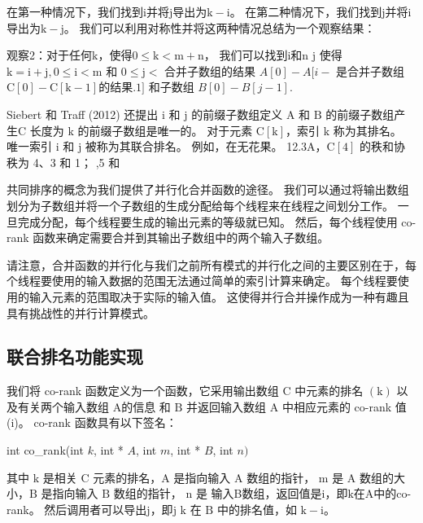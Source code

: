 在第一种情况下，我们找到$\mathrm{i}$并将$\mathrm{j}$导出为$\mathrm{k}-\mathrm{i}$。 
在第二种情况下，我们找到$\mathrm{j}$并将$\mathrm{i}$导出为$\mathrm{k}-\mathrm{j}$。 
我们可以利用对称性并将这两种情况总结为一个观察结果：

观察2：对于任何$\mathrm{k}$，使得$0 \leq \mathrm{k}<\mathrm{m}+\mathrm{n}$，
我们可以找到$\mathrm{i}$和$\mathrm {n}$ {j} 使得 $\mathrm{k}=\mathrm{i}+\mathrm{j}, 0 \leq \mathrm{i}<\mathrm{m}$ 和 $0 \leq \mathrm {j}<$ 合并子数组的结果 $A[0]-A[i-$ 是合并子数组 $\mathrm{C}[0]-\mathrm{C}[\mathrm{k}-1 ]$的结果$.1]$ 和子数组 $B[0]-B[j-1]$.

Siebert 和 Traff (2012) 还提出 $\mathrm{i}$ 和 $\mathrm{j}$ 的前缀子数组定义 $\mathrm{A}$ 和 $\mathrm{B}$ 的前缀子数组产生$\mathrm{C}$ 长度为 $\mathrm{k}$ 的前缀子数组是唯一的。 
对于元素 $\mathrm{C}[\mathrm{k}]$，索引 $\mathrm{k}$ 称为其排名。 
唯一索引 $\mathrm{i}$ 和 $\mathrm{j}$ 被称为其联合排名。 
例如，在无花果。 12.3A，$\mathrm{C}[4]$ 的秩和协秩为 4、3 和 1； ,5 和

共同排序的概念为我们提供了并行化合并函数的途径。 
我们可以通过将输出数组划分为子数组并将一个子数组的生成分配给每个线程来在线程之间划分工作。 
一旦完成分配，每个线程要生成的输出元素的等级就已知。 
然后，每个线程使用 co-rank 函数来确定需要合并到其输出子数组中的两个输入子数组。

请注意，合并函数的并行化与我们之前所有模式的并行化之间的主要区别在于，每个线程要使用的输入数据的范围无法通过简单的索引计算来确定。 每个线程要使用的输入元素的范围取决于实际的输入值。 这使得并行合并操作成为一种有趣且具有挑战性的并行计算模式。

\subsection{联合排名功能实现}
我们将 co-rank 函数定义为一个函数，它采用输出数组 $\mathrm{C}$ 中元素的排名 $(\mathrm{k})$ 以及有关两个输入数组 $\mathrm{A} 的信息 $ 和 $\mathrm{B}$ 并返回输入数组 A 中相应元素的 co-rank 值 (i)。 co-rank 函数具有以下签名：

int co\_rank(int $k$, int * $A$, int $m$, int * $B$, int $n)$

其中 $\mathrm{k}$ 是相关 $\mathrm{C}$ 元素的排名，$\mathrm{A}$ 是指向输入 $\mathrm{A}$ 数组的指针，
$\mathrm{ m}$ 是 $\mathrm{A}$ 数组的大小，$\mathrm{B}$ 是指向输入 $\mathrm{B}$ 数组的指针，
$\mathrm{n}$ 是 输入B数组，返回值是$\mathrm{i}$，即$\mathrm{k}$在A中的co-rank。
然后调用者可以导出$\mathrm{j}$，即$\mathrm{j}$ $\mathrm{k}$ 在 $\mathrm{B}$ 中的排名值，如 $\mathrm{k}-\mathrm{i}$。


